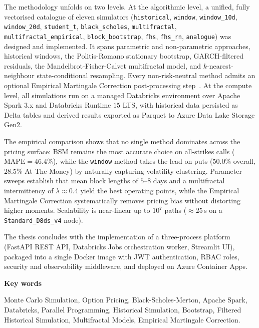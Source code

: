 \documentclass[12pt]{article}
\begin{document}
The methodology unfolds on two levels. At the algorithmic level, a unified, fully vectorised catalogue of eleven simulators (\texttt{historical}, \texttt{window}, \texttt{window\_10d}, \texttt{window\_20d}, \texttt{student\_t}, \texttt{black\_scholes}, \texttt{multifractal}, \texttt{multifractal\_empirical}, \texttt{block\_bootstrap}, \texttt{fhs}, \texttt{fhs\_rn}, \texttt{analogue}) was designed and implemented. It spans parametric and non-parametric approaches, historical windows, the Politis-Romano stationary bootstrap, GARCH-filtered residuals, the Mandelbrot-Fisher-Calvet multifractal model, and $k$-nearest-neighbour state-conditional resampling. Every non-risk-neutral method admits an optional Empirical Martingale Correction post-processing step~\cite{DuanSimonato1998}. At the compute level, all simulations run on a managed Databricks environment over Apache Spark $3$.x and Databricks Runtime $15$ LTS, with historical data persisted as Delta tables and derived results exported as Parquet to Azure Data Lake Storage Gen2.

The empirical comparison shows that no single method dominates across the pricing surface: BSM remains the most accurate choice on all-strikes calls ($\mathrm{MAPE} = 46.4\%$), while the \texttt{window} method takes the lead on puts ($50.0\%$ overall, $28.5\%$ At-The-Money) by naturally capturing volatility clustering. Parameter sweeps establish that mean block lengths of $5$--$8$ days and a multifractal intermittency of $\lambda \approx 0.4$ yield the best operating points, while the Empirical Martingale Correction systematically removes pricing bias without distorting higher moments. Scalability is near-linear up to $10^{7}$ paths ($\approx 25\,$s on a \texttt{Standard\_D8ds\_v4} node).

The thesis concludes with the implementation of a three-process platform (FastAPI REST API, Databricks Jobs orchestration worker, Streamlit UI), packaged into a single Docker image with JWT authentication, RBAC roles, security and observability middleware, and deployed on Azure Container Apps.

\vspace{2ex}
\begin{center}
\begin{large}\textbf{Key words}\end{large}
\end{center}

Monte Carlo Simulation, Option Pricing, Black-Scholes-Merton, Apache Spark, Databricks, Parallel Programming, Historical Simulation, Bootstrap, Filtered Historical Simulation, Multifractal Models, Empirical Martingale Correction.
\end{document}
